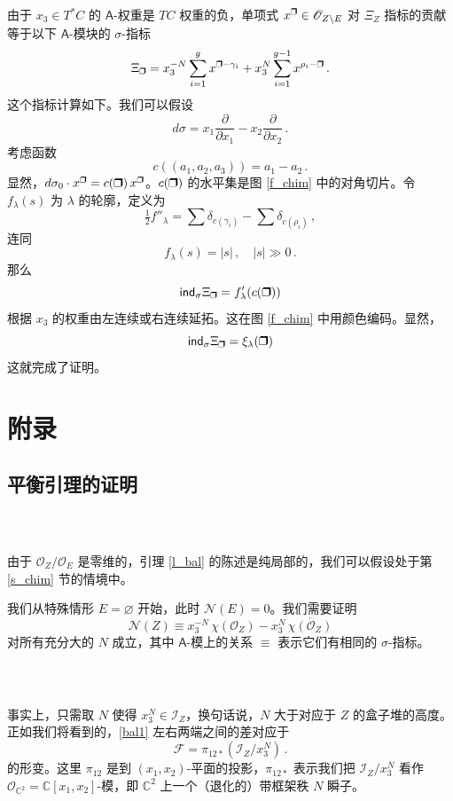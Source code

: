 \documentclass[12pt]{article}
\newcommand{\C}{\mathbb{C}}
\newcommand{\cO}{\mathscr{O}}
\newcommand{\cN}{\mathscr{N}}
\newcommand{\bx}{\textup{\ding{114}}}
\newcommand{\sind}{\mathsf{ind}}
\newcommand{\cF}{\mathscr{F}}
\newcommand{\cI}{\mathscr{I}}
\newcommand{\bA}{\mathsf{A}}
\theoremstyle{definition}
\begin{document}
由于 $x_3\in T^*C$ 的 $\bA$-权重是 $TC$ 权重的负，单项式 $x^{\bx}\in \cO_{Z\setminus E}$ 对 $\Xi_Z$ 指标的贡献等于以下 $\bA$-模块的 $\sigma$-指标
$$
\Xi_{\bx}= x_3^{-N} \sum_{i=1}^g{x^{\bx-\gamma_i}} + x_3^{N}
\sum_{i=1}^{g-1}{x^{\rho_i-\bx}} \,.
$$
这个指标计算如下。我们可以假设
$$
d\sigma  =  x_1 \frac{\partial}{\partial x_1}
- x_2 \frac{\partial}{\partial x_2} \,.
$$
考虑函数
$$
c((a_1,a_2,a_3)) = a_1 - a_2 \,.
$$
显然，$d\sigma_0 \cdot x^{\bx} = c(\bx)\, x^{\bx}$。$c(\bx)$ 的水平集是图 \ref{f_chim} 中的对角切片。令 $f_{\lambda}(s)$ 为 $\lambda$ 的轮廓，定义为
\begin{equation}
\tfrac{1}{2} f''_{\lambda} = \sum \delta_{c(\gamma_i)}
- \sum \delta_{c(\rho_i)}\,,\label{profile}
\end{equation}
连同
$$
f_{\lambda}(s) = |s|\,, \quad |s| \gg 0 \,.
$$
那么
$$
\sind_{\sigma} \Xi_{\bx} = f'_{\lambda}(c(\bx))
$$
根据 $x_3$ 的权重由左连续或右连续延拓。这在图 \ref{f_chim} 中用颜色编码。显然，
$$
\sind_{\sigma} \Xi_{\bx} = \xi_{\lambda}(\bx)
$$
这就完成了证明。

\appendix

\section{附录}

\subsection{平衡引理的证明}

\subsubsection{\ }

由于 $\cO_{Z}/\cO_{E}$ 是零维的，引理 \ref{l_bal} 的陈述是纯局部的，我们可以假设处于第 \ref{s_chim} 节的情境中。

我们从特殊情形 $E=\varnothing$ 开始，此时 $\cN(E)=0$。我们需要证明
\begin{equation}
\cN(Z) \equiv x_3^{-N} \, \chi(\cO_Z) -
x_3^{N} \, \overline{\chi(\cO_Z)}
\label{bal1}
\end{equation}
对所有充分大的 $N$ 成立，其中 $\bA$-模上的关系 $\equiv$ 表示它们有相同的 $\sigma$-指标。

\subsubsection{\ }

事实上，只需取 $N$ 使得 $x_3^N \in \cI_Z$，换句话说，$N$ 大于对应于 $Z$ 的盒子堆的高度。正如我们将看到的，\eqref{bal1} 左右两端之间的差对应于
$$
\cF = \pi_{12*} \left(\cI_{Z}/x_3^N \right)\,.
$$
的形变。这里 $\pi_{12}$ 是到 $(x_1,x_2)$-平面的投影，$\pi_{12*}$ 表示我们把 $\cI_{Z}/x_3^N$ 看作 $\cO_{\C^2}=\C[x_1,x_2]$-模，即 $\C^2$ 上一个（退化的）带框架秩 $N$ 瞬子。
\end{document}
